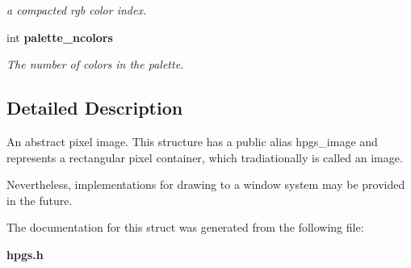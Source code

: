 \begin{DoxyCompactItemize}
\begin{DoxyCompactList}\small\item\em a compacted rgb color index. \item\end{DoxyCompactList}\item 
int {\bf palette\_\-ncolors}\label{structhpgs__image__st_a0816acf72c5fc421afeefc642d13b887}

\begin{DoxyCompactList}\small\item\em The number of colors in the palette. \item\end{DoxyCompactList}\end{DoxyCompactItemize}


\subsection{Detailed Description}
An abstract pixel image. This structure has a public alias {\ttfamily hpgs\_\-image} and represents a rectangular pixel container, which tradiationally is called an image.

Nevertheless, implementations for drawing to a window system may be provided in the future. 

The documentation for this struct was generated from the following file:\begin{DoxyCompactItemize}
\item 
{\bf hpgs.h}\end{DoxyCompactItemize}
